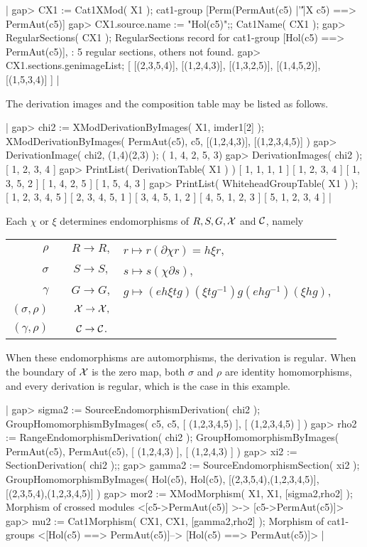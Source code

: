 |    gap> CX1 := Cat1XMod( X1 );
    cat1-group [Perm(PermAut(c5) |'\|'|X c5) ==> PermAut(c5)] 
    gap> CX1.source.name := "Hol(c5)";; Cat1Name( CX1 );
    gap> RegularSections( CX1 );
    RegularSections record for cat1-group [Hol(c5) ==> PermAut(c5)],
    : 5 regular sections, others not found.
    gap> CX1.sections.genimageList;
    [ [(2,3,5,4)], [(1,2,4,3)], [(1,3,2,5)], [(1,4,5,2)], [(1,5,3,4)] ]  |

The derivation images and the composition table may be listed as follows.

|    gap> chi2 := XModDerivationByImages( X1, imder1[2] ); 
    XModDerivationByImages( PermAut(c5), c5, [(1,2,4,3)], [(1,2,3,4,5)] )
    gap> DerivationImage( chi2, (1,4)(2,3) );
    ( 1, 4, 2, 5, 3)
    gap> DerivationImages( chi2 );
    [ 1, 2, 3, 4 ]
    gap> PrintList( DerivationTable( X1 ) )
    [ 1, 1, 1, 1 ]
    [ 1, 2, 3, 4 ]
    [ 1, 3, 5, 2 ]
    [ 1, 4, 2, 5 ]
    [ 1, 5, 4, 3 ]
    gap> PrintList( WhiteheadGroupTable( X1 ) );
    [ 1, 2, 3, 4, 5 ]
    [ 2, 3, 4, 5, 1 ]
    [ 3, 4, 5, 1, 2 ]
    [ 4, 5, 1, 2, 3 ]
    [ 5, 1, 2, 3, 4 ]  |


Each  $\chi$  or  $\xi$  determines endomorphisms of  
$R, S, G, {\cal X}$ and ${\cal C}$, namely\:
\begin{center}
\begin{tabular}{rccl}
    $\rho$  &  \:  &  $R \to R,$ 
                  &  $r \mapsto r(\partial \chi r) = h \xi r$,  \\
  $\sigma$  &  \:  &  $S \to S,$
                  &  $s \mapsto s(\chi \partial s)$,            \\
  $\gamma$  &  \:  &  $G \to G,$
                  &  $g \mapsto (eh \xi tg)(\xi tg^{-1})g(ehg^{-1})(\xi hg)$,\\
  $(\sigma,\rho)$ & \:  & ${\cal X} \to {\cal X},$              \\
  $(\gamma,\rho)$ & \:  & ${\cal C} \to {\cal C}$.
\end{tabular}
\end{center}

When these endomorphisms are automorphisms, the derivation is regular.  
When the boundary of ${\cal X}$ is the zero map,
both $\sigma$ and $\rho$ are identity homomorphisms, 
and every derivation is regular, which is the case in this example.

|    gap> sigma2 := SourceEndomorphismDerivation( chi2 );
    GroupHomomorphismByImages( c5, c5, [ (1,2,3,4,5) ], [ (1,2,3,4,5) ] )
    gap> rho2 := RangeEndomorphismDerivation( chi2 );
    GroupHomomorphismByImages( PermAut(c5), PermAut(c5), [ (1,2,4,3) ], 
       [ (1,2,4,3) ] )
    gap> xi2 := SectionDerivation( chi2 );;
    gap> gamma2 := SourceEndomorphismSection( xi2 );
    GroupHomomorphismByImages( Hol(c5), Hol(c5), [(2,3,5,4),(1,2,3,4,5)],
       [(2,3,5,4),(1,2,3,4,5)] )
    gap> mor2 := XModMorphism( X1, X1, [sigma2,rho2] );
    Morphism of crossed modules <[c5->PermAut(c5)] >-> [c5->PermAut(c5)]>
    gap> mu2 := Cat1Morphism( CX1, CX1, [gamma2,rho2] );
    Morphism of cat1-groups <[Hol(c5) ==> PermAut(c5)]-->
       [Hol(c5) ==> PermAut(c5)]>  |

